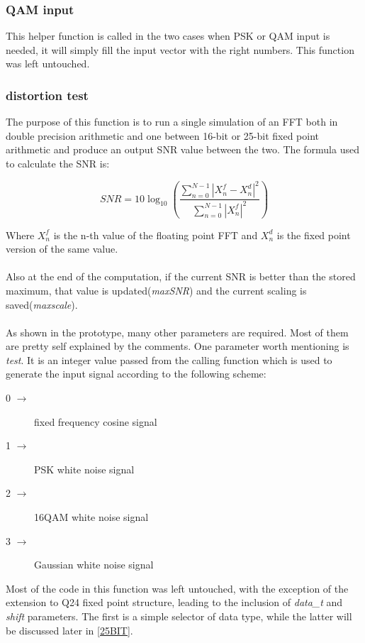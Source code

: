 \documentclass[a4paper]{article}
\begin{document}
\subsubsection{QAM input}
This helper function is called in the two cases when PSK or QAM input is needed, it will simply fill the input vector with the right numbers. This function was left untouched.
\subsubsection{distortion test}
The purpose of this function is to run a single simulation of an FFT both in double precision arithmetic and one between 16-bit or 25-bit fixed point arithmetic and produce an output SNR value between the two.
The formula used to calculate the SNR is:

$$\mathit{SNR} = 10\log_{10}{\left(\frac{\sum_{n=0}^{N-1}{|X_n^f - X_n^d|^2}}{\sum_{n=0}^{N-1}{|X_n^f|^2}}\right)}$$

Where $X_n^f$ is the n-th value of the floating point FFT and $X_n^d$ is the fixed point version of the same value.\\\\
Also at the end of the computation, if the current SNR is better than the stored maximum, that value is updated(\textit{maxSNR}) and the current scaling is saved(\textit{maxscale}).\\\\
As shown in the prototype, many other parameters are required. Most of them are pretty self explained by the comments.
One parameter worth mentioning is \textit{test}. It is an integer value passed from the calling function which is used to generate the input signal according to the following scheme:
\begin{description}
	\item[0 $\rightarrow$] fixed frequency cosine signal
	\item[1 $\rightarrow$] PSK white noise signal
	\item[2 $\rightarrow$] 16QAM white noise signal
	\item[3 $\rightarrow$] Gaussian white noise signal
\end{description}

Most of the code in this function was left untouched, with the exception of the extension to Q24 fixed point structure, leading to the inclusion of \textit{data\_t} and \textit{shift} parameters.
The first is a simple selector of data type, while the latter will be discussed later in \ref{25BIT}.
\end{document}
